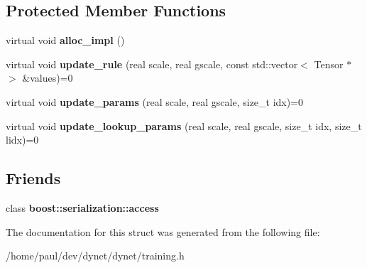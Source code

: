 \subsection*{Protected Member Functions}
\begin{DoxyCompactItemize}
\item 
\hypertarget{structdynet_1_1Trainer_aa4d8c114bd3f4319d0591dbcaa93e97e}{}virtual void {\bfseries alloc\+\_\+impl} ()\label{structdynet_1_1Trainer_aa4d8c114bd3f4319d0591dbcaa93e97e}

\item 
\hypertarget{structdynet_1_1Trainer_a85e86d4970c50985f6cc79f5901c576e}{}virtual void {\bfseries update\+\_\+rule} (real scale, real gscale, const std\+::vector$<$ Tensor $\ast$ $>$ \&values)=0\label{structdynet_1_1Trainer_a85e86d4970c50985f6cc79f5901c576e}

\item 
\hypertarget{structdynet_1_1Trainer_a43093c84d5faab07d9e906af61f13bdb}{}virtual void {\bfseries update\+\_\+params} (real scale, real gscale, size\+\_\+t idx)=0\label{structdynet_1_1Trainer_a43093c84d5faab07d9e906af61f13bdb}

\item 
\hypertarget{structdynet_1_1Trainer_ab8a4f50d1d3bcf8178984c040338972a}{}virtual void {\bfseries update\+\_\+lookup\+\_\+params} (real scale, real gscale, size\+\_\+t idx, size\+\_\+t lidx)=0\label{structdynet_1_1Trainer_ab8a4f50d1d3bcf8178984c040338972a}

\end{DoxyCompactItemize}
\subsection*{Friends}
\begin{DoxyCompactItemize}
\item 
\hypertarget{structdynet_1_1Trainer_ac98d07dd8f7b70e16ccb9a01abf56b9c}{}class {\bfseries boost\+::serialization\+::access}\label{structdynet_1_1Trainer_ac98d07dd8f7b70e16ccb9a01abf56b9c}

\end{DoxyCompactItemize}


The documentation for this struct was generated from the following file\+:\begin{DoxyCompactItemize}
\item 
/home/paul/dev/dynet/dynet/training.\+h\end{DoxyCompactItemize}
